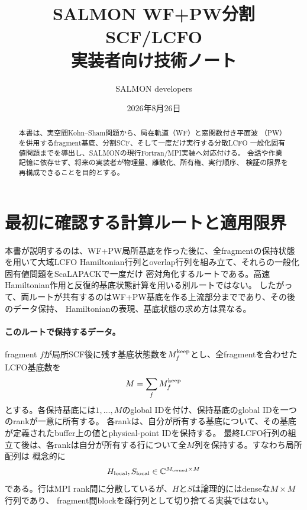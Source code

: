 \documentclass[11pt,a4paper]{article}
\title{\sffamily SALMON WF+PW分割SCF/LCFO\\実装者向け技術ノート}
\author{SALMON developers}
\date{2026年8月26日}
\begin{document}
\maketitle
\begin{abstract}
本書は、実空間Kohn--Sham問題から、局在軌道（WF）と窓関数付き平面波
（PW）を併用するfragment基底、分割SCF、そして一度だけ実行する分散LCFO
一般化固有値問題までを導出し、SALMONの現行Fortran/MPI実装へ対応付ける。
会話や作業記憶に依存せず、将来の実装者が物理量、離散化、所有権、実行順序、
検証の限界を再構成できることを目的とする。
\end{abstract}

\section*{最初に確認する計算ルートと適用限界}
本書が説明するのは、WF+PW局所基底を作った後に、全fragmentの保持状態を用いて大域LCFO
Hamiltonian行列とoverlap行列を組み立て、それらの一般化固有値問題をScaLAPACKで一度だけ
密対角化するルートである。高速Hamiltonian作用と反復的基底状態計算を用いる別ルートではない。
したがって、両ルートが共有するのはWF+PW基底を作る上流部分までであり、その後のデータ保持、
Hamiltonianの表現、基底状態の求め方は異なる。

\paragraph{このルートで保持するデータ。}
fragment $f$が局所SCF後に残す基底状態数を$M_f^{\rm keep}$とし、全fragmentを合わせたLCFO基底数を
\begin{equation}
 M=\sum_f M_f^{\rm keep}
 \label{eq:upfront-lcfo-dimension}
\end{equation}
とする。各保持基底には$1,\ldots,M$のglobal IDを付け、保持基底のglobal IDを一つのrankが一意に所有する。
各rankは、自分が所有する基底について、その基底が定義されたbuffer上の値とphysical-point IDを保持する。
最終LCFO行列の組立て後は、各rankは自分が所有する行について全$M$列を保持する。すなわち局所配列は
概念的に
\begin{equation}
 H_{\rm local},S_{\rm local}\in\mathbb C^{M_{\rm owned}\times M}
 \label{eq:upfront-row-distributed-storage}
\end{equation}
である。行はMPI rank間に分散しているが、$H$と$S$は論理的にはdenseな$M\times M$行列であり、
fragment間blockを疎行列として切り捨てる実装ではない。
\end{document}
